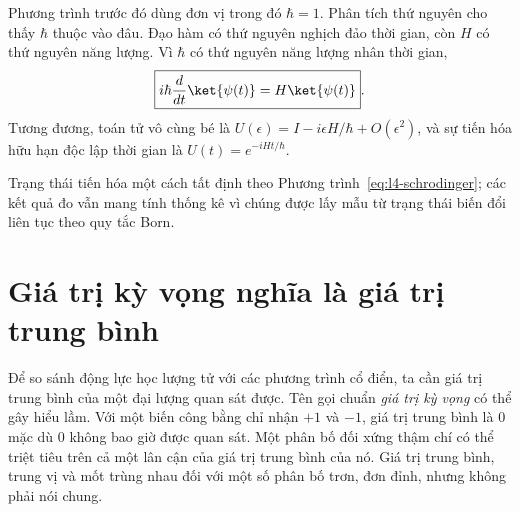 Phương trình trước đó dùng đơn vị trong đó \(\hbar=1\). Phân tích thứ nguyên cho thấy \(\hbar\) thuộc vào đâu. Đạo hàm có thứ nguyên nghịch đảo thời gian, còn \(H\) có thứ nguyên năng lượng. Vì \(\hbar\) có thứ nguyên năng lượng nhân thời gian,
\begin{equation}
\boxed{i\hbar\frac{d}{dt}\ket{\psi(t)}=H\ket{\psi(t)}}.
\label{eq:l4-schrodinger}
\end{equation}
Tương đương, toán tử vô cùng bé là \(U(\epsilon)=I-i\epsilon H/\hbar+O(\epsilon^2)\), và sự tiến hóa hữu hạn độc lập thời gian là \(U(t)=e^{-iHt/\hbar}\).

\begin{classroomqa}
\end{classroomqa}

Trạng thái tiến hóa một cách tất định theo Phương trình~\eqref{eq:l4-schrodinger}; các kết quả đo vẫn mang tính thống kê vì chúng được lấy mẫu từ trạng thái biến đổi liên tục theo quy tắc Born.

\begin{classroomqa}
\end{classroomqa}

\section{Giá trị kỳ vọng nghĩa là giá trị trung bình}

Để so sánh động lực học lượng tử với các phương trình cổ điển, ta cần giá trị trung bình của một đại lượng quan sát được. Tên gọi chuẩn \emph{giá trị kỳ vọng} có thể gây hiểu lầm. Với một biến công bằng chỉ nhận \(+1\) và \(-1\), giá trị trung bình là 0 mặc dù 0 không bao giờ được quan sát. Một phân bố đối xứng thậm chí có thể triệt tiêu trên cả một lân cận của giá trị trung bình của nó. Giá trị trung bình, trung vị và mốt trùng nhau đối với một số phân bố trơn, đơn đỉnh, nhưng không phải nói chung.

